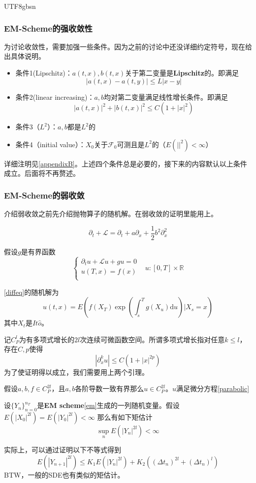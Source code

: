 \documentclass{article}
\begin{document}
\begin{CJK*}{UTF8}{gbsn}
\subsubsection{EM-Scheme的强收敛性}
为讨论收敛性，需要加强一些条件。因为之前的讨论中还没详细约定符号，现在给出具体说明。
\begin{itemize}\label{conditions}
    \item 条件1(Lipschitz)：$a(t,x),b(t,x)$关于第二变量是\textbf{Lipschitz}的。即满足
    $$|a(t,x)-a(t,y)|\le L|x-y| $$
    \item 条件2(linear increasing)：$a,b$均对第二变量满足线性增长条件。即满足
    $$|a(t,x)|^2+|b(t,x)|^2\le C(1+|x|^2) $$
    \item 条件3（$L^2$）：$a,b$都是$L^2$的
    \item 条件4（initial value）：$X_0$关于$\mathcal{F}_0$可测且是$L^2$的（$E(||^2)<\infty$）
\end{itemize}
详细注明见\ref{appendixB}。上述四个条件总是必要的，接下来的内容默认以上条件成立。后面将不再赘述。

\subsubsection{EM-Scheme的弱收敛}
介绍弱收敛之前先介绍抛物算子的随机解。在弱收敛的证明里能用上。
\begin{definition}[抛物算子]
    $$
    \partial_t+\mathcal{L}=\partial_t+a\partial_x+\frac{1}{2}b^2\partial_x^2
    $$
\end{definition}

\begin{definition}
假设$g$是有界函数
    $$
    \begin{cases}
        \partial_tu+\mathcal{L}u+gu=0&\\
        u(T,x)=f(x)&\\
    \end{cases}
    u:[0,T]\times\mathbb{R}\label{parabolic}
    $$
\end{definition}

\begin{lemma}
\ref{diffeq}的随机解为
    $$
    u(t,x)=E\left(f(X_T)\exp\left(\int_s^Tg(X_u)\mathrm{d}u\right)\Bigg|X_s=x\right)
    $$
    其中$X_t$是$It\hat{o}$。
\end{lemma}
记$C_P^{l}$为有多项式增长的$2l$次连续可微函数空间。所谓多项式增长指对任意$k\le l$，存在$C,p$使得
$$
|\partial_x^ku|\le C(1+|x|^{2p})
$$
为了使证明得以成立，我们需要用上两个引理。
\begin{lemma}
    假设$a,b,f\in C_P^{2l}$，且$a,b$各阶导数一致有界那么$u\in C_P^{2l}$。$u$满足微分方程\ref{parabolic}
\end{lemma}
\begin{lemma}
设$\{Y_n\}_{n=0}^{n_T}$是\textbf{EM scheme}\ref{em}生成的一列随机变量。假设$E(|X_0|^{2l})=E(|Y_0|^{2l})<\infty$
那么有如下矩估计
    $$\sup_nE(|Y_{n}|^{2l})<\infty$$
\end{lemma}
实际上，可以通过证明以下不等式得到
$$
E(|Y_{n+1}|^{2l})\le K_1E(|Y_{n}|^{2l})+K_2\left((\Delta t_n)^{2l}+(\Delta t_n)^{l}\right)
$$
BTW，一般的SDE也有类似的矩估计。


\end{CJK*}
\end{document}

